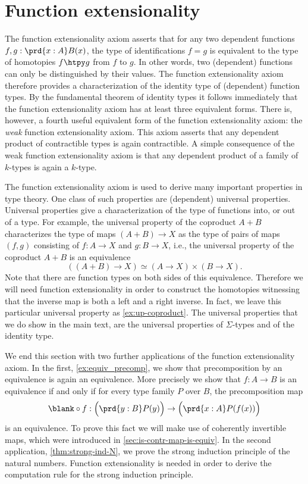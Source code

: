 \section{Function extensionality}
\label{chap:funext}

The function extensionality axiom asserts that for any two dependent functions $f,g:\prd{x:A}B(x)$, the type of identifications $f=g$ is equivalent to the type of homotopies $f\htpy g$ from $f$ to $g$. In other words, two (dependent) functions can only be distinguished by their values. The function extensionality axiom therefore provides a characterization of the identity type of (dependent) function types. By the fundamental theorem of identity types it follows immediately that the function extensionality axiom has at least three equivalent forms. There is, however, a fourth useful equivalent form of the function extensionality axiom: the \emph{weak} function extensionality axiom. This axiom asserts that any dependent product of contractible types is again contractible. A simple consequence of the weak function extensionality axiom is that any dependent product of a family of $k$-types is again a $k$-type.

The function extensionality axiom is used to derive many important properties in type theory. One class of such properties are (dependent) universal properties. Universal properties give a characterization of the type of functions into, or out of a type. For example, the universal property of the coproduct $A+B$ characterizes the type of maps $(A+B)\to X$ as the type of pairs of maps $(f,g)$ consisting of $f:A\to X$ and $g:B\to X$, i.e., the universal property of the coproduct $A+B$ is an equivalence
\begin{equation*}
  ((A+B)\to X)\simeq (A\to X)\times (B\to X).
\end{equation*}
Note that there are function types on both sides of this equivalence. Therefore we will need function extensionality in order to construct the homotopies witnessing that the inverse map is both a left and a right inverse. In fact, we leave this particular universal property as \cref{ex:up-coproduct}. The universal properties that we do show in the main text, are the universal properties of $\Sigma$-types and of the identity type. 

We end this section with two further applications of the function extensionality axiom. In the first, \cref{ex:equiv_precomp}, we show that precomposition by an equivalence is again an equivalence. More precisely we show that $f:A\to B$ is an equivalence if and only if for every type family $P$ over $B$, the precomposition map
\begin{equation*}
  \blank\circ f :\Big(\prd{y:B}P(y)\Big)\to \Big(\prd{x:A}P(f(x))\Big)
\end{equation*}
is an equivalence. To prove this fact we will make use of coherently invertible maps, which were introduced in \cref{sec:is-contr-map-is-equiv}. In the second application, \cref{thm:strong-ind-N}, we prove the strong induction principle of the natural numbers. Function extensionality is needed in order to derive the computation rule for the strong induction principle.

